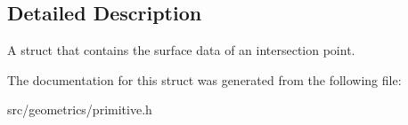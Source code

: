 \subsection{Detailed Description}
A struct that contains the surface data of an intersection point. 

The documentation for this struct was generated from the following file\+:\begin{DoxyCompactItemize}
\item 
src/geometrics/primitive.\+h\end{DoxyCompactItemize}
